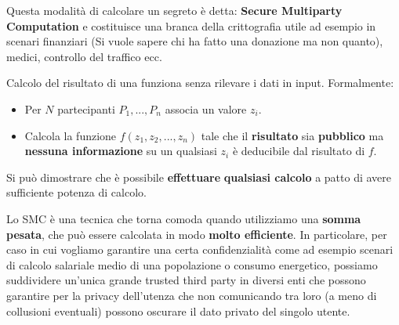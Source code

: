 Questa modalità di calcolare un segreto è detta: \textbf{Secure Multiparty Computation} e costituisce una branca della crittografia utile ad esempio in scenari finanziari (Si vuole sapere chi ha fatto una donazione ma non quanto), medici, controllo del traffico ecc. 
\begin{definition}\label{def:smc}
Calcolo del risultato di una funziona senza rilevare i dati in input. Formalmente: 
\begin{itemize}
    \item Per $N$ partecipanti $P_1,...,P_n$ associa un valore $z_i$.
    \item Calcola la funzione $f(z_1,z_2,...,z_n)$ tale che il \textbf{risultato} sia \textbf{pubblico} ma \textbf{nessuna informazione} su un qualsiasi $z_i$ è deducibile dal risultato di $f$.
\end{itemize}
\begin{remark}
Si può dimostrare che è possibile \textbf{effettuare} \textbf{qualsiasi calcolo} a patto di avere sufficiente potenza di calcolo.
\end{remark}
\end{definition}
Lo SMC è una tecnica che torna comoda quando utilizziamo una \textbf{somma pesata}, che può essere calcolata in modo \textbf{molto efficiente}. In particolare, per caso in cui vogliamo garantire una certa confidenzialità come ad esempio scenari di calcolo salariale medio di una popolazione o consumo energetico, possiamo suddividere un'unica grande trusted third party in diversi enti che possono garantire per la privacy dell'utenza che non comunicando tra loro (a meno di collusioni eventuali) possono oscurare il dato privato del singolo utente.
